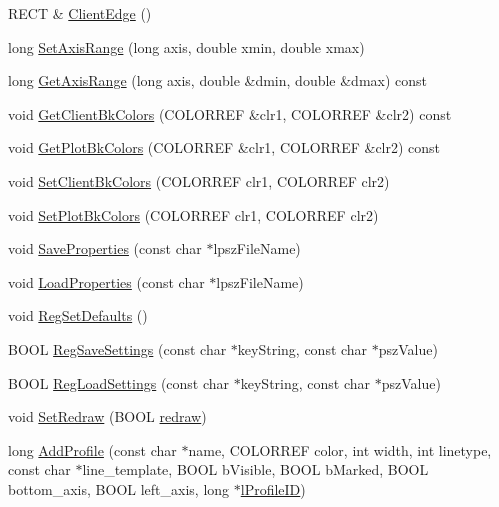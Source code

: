\begin{DoxyCompactItemize}
R\-E\-C\-T \& \hyperlink{class_x_y_plot_ad22253ae6ea84e6a6c6671f3226831d1}{Client\-Edge} ()
\item 
long \hyperlink{class_x_y_plot_ab06e0f991606941364a009a3770bfbb4}{Set\-Axis\-Range} (long axis, double xmin, double xmax)
\item 
long \hyperlink{class_x_y_plot_a310603b5188a53ced932739e42fe8326}{Get\-Axis\-Range} (long axis, double \&dmin, double \&dmax) const 
\item 
void \hyperlink{class_x_y_plot_a35766a90bd83cb09da155c4298f0bde0}{Get\-Client\-Bk\-Colors} (C\-O\-L\-O\-R\-R\-E\-F \&clr1, C\-O\-L\-O\-R\-R\-E\-F \&clr2) const 
\item 
void \hyperlink{class_x_y_plot_a913bed0cc365f11dd2b9a3a3eed83e3b}{Get\-Plot\-Bk\-Colors} (C\-O\-L\-O\-R\-R\-E\-F \&clr1, C\-O\-L\-O\-R\-R\-E\-F \&clr2) const 
\item 
void \hyperlink{class_x_y_plot_ae7eb57cbc3b2364e6dc24318f01e06ed}{Set\-Client\-Bk\-Colors} (C\-O\-L\-O\-R\-R\-E\-F clr1, C\-O\-L\-O\-R\-R\-E\-F clr2)
\item 
void \hyperlink{class_x_y_plot_aa993a27506127bba579dcc04ebc2b806}{Set\-Plot\-Bk\-Colors} (C\-O\-L\-O\-R\-R\-E\-F clr1, C\-O\-L\-O\-R\-R\-E\-F clr2)
\item 
void \hyperlink{class_x_y_plot_a4f346829b2127ef73fb635098b82254d}{Save\-Properties} (const char $\ast$lpsz\-File\-Name)
\item 
void \hyperlink{class_x_y_plot_a4ac4ace528dd0b35cf464e4dd81d86e4}{Load\-Properties} (const char $\ast$lpsz\-File\-Name)
\item 
void \hyperlink{class_x_y_plot_ac1bd598d006342d3c13cc6967f909c6b}{Reg\-Set\-Defaults} ()
\item 
B\-O\-O\-L \hyperlink{class_x_y_plot_a87638a8dc1049113eaa0662d4faa5656}{Reg\-Save\-Settings} (const char $\ast$key\-String, const char $\ast$psz\-Value)
\item 
B\-O\-O\-L \hyperlink{class_x_y_plot_a3212ec1373f6fb8d8cf0a1a75cae043a}{Reg\-Load\-Settings} (const char $\ast$key\-String, const char $\ast$psz\-Value)
\item 
void \hyperlink{class_x_y_plot_a946d7193c76729f7972cfd434c6df5ed}{Set\-Redraw} (B\-O\-O\-L \hyperlink{class_x_y_plot_ad73c4a652c950f36a9544c6682a0c35e}{redraw})
\item 
long \hyperlink{class_x_y_plot_aded18e10ec4f201e8cc172540fd5ff8e}{Add\-Profile} (const char $\ast$name, C\-O\-L\-O\-R\-R\-E\-F color, int width, int linetype, const char $\ast$line\-\_\-template, B\-O\-O\-L b\-Visible, B\-O\-O\-L b\-Marked, B\-O\-O\-L bottom\-\_\-axis, B\-O\-O\-L left\-\_\-axis, long $\ast$\hyperlink{namespacexyplot_a37f2e7672aa877ee74f4ab91e6a97a88}{l\-Profile\-I\-D})

\end{DoxyCompactItemize}

